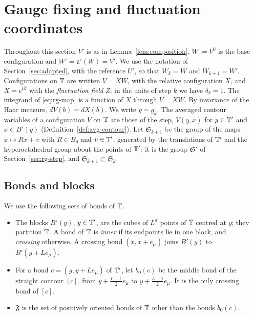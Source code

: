 \section{Gauge fixing and fluctuation coordinates}\label{sec:fluctuations}

Throughout this section $V'$ is as in Lemma~\ref{lem:composition}, $W:=V^0$ is the base configuration and $W'=\mathfrak a'(W)=V'$. We use the notation of Section~\ref{sec:adapted}, with the reference $U'$, so that $W_k=W$ and $W_{k+1}=W'$. Configurations on $\mathbb T$ are written $V=XW$, with the relative configuration $X$, and $X=e^{\ii Z}$ with the \emph{fluctuation field} $Z$; in the units of step $k$ we have $\delta_k=1$. The integrand of \eqref{eq:rg-map} is a function of $X$ through $V=XW$. By invariance of the Haar measure, $dV(b)=dX(b)$. We write $g=g_k$. The averaged contour variables of a configuration $V$ on $\mathbb T$ are those of the step, $V(y,x)$ for $y\in\mathbb T'$ and $x\in B'(y)$ (Definition~\ref{def:avg-contour}). Let $\mathfrak S_{k+1}$ be the group of the maps $x\mapsto Rx+v$ with $R\in B_4$ and $v\in\mathbb T'$, generated by the translations of $\mathbb T'$ and the hyperoctahedral group about the points of $\mathbb T'$; it is the group $\mathfrak S'$ of Section~\ref{sec:rg-step}, and $\mathfrak S_{k+1}\subset\mathfrak S_k$.

\subsection{Bonds and blocks}\label{ss:32.1}

\begin{definition}\label{def:bonds}
We use the following sets of bonds of $\mathbb T$.
\begin{itemize}
\item The blocks $B'(y)$, $y\in\mathbb T'$, are the cubes of $L^d$ points of $\mathbb T$ centred at $y$; they partition $\mathbb T$. A bond of $\mathbb T$ is \emph{inner} if its endpoints lie in one block, and \emph{crossing} otherwise. A crossing bond $(x,x+e_\mu)$ joins $B'(y)$ to $B'(y+Le_\mu)$.
\item For a bond $c=(y,y+Le_\mu)$ of $\mathbb T'$, let $b_0(c)$ be the middle bond of the straight contour $[c]$, from $y+\frac{L-1}2e_\mu$ to $y+\frac{L+1}2e_\mu$. It is the only crossing bond of $[c]$.
\item $\mathfrak F$ is the set of positively oriented bonds of $\mathbb T$ other than the bonds $b_0(c)$.
\end{itemize}
\end{definition}

